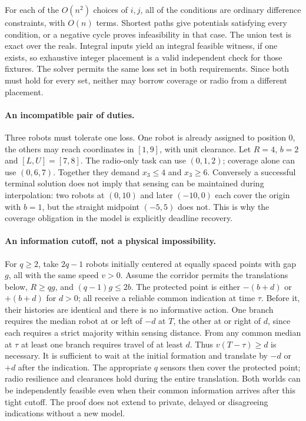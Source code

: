\documentclass{article}
\begin{document}
For each of the $O(n^2)$ choices of $i,j$, all of the conditions are
ordinary difference constraints, with $O(n)$ terms. Shortest paths
give potentials satisfying every condition, or a negative cycle
proves infeasibility in that case. The union test is exact over the
reals. Integral inputs yield an integral feasible witness, if
one exists, so exhaustive integer placement is a valid independent
check for those fixtures. The solver permits the same loss set in
both requirements. Since both must hold for every set, neither may
borrow coverage or radio from a different placement.

\paragraph{An incompatible pair of duties.}
Three robots must tolerate one loss. One robot is already assigned to
position 0, the others may reach coordinates in $[1,9]$, with unit
clearance. Let $R=4$, $b=2$ and $[L,U]=[7,8]$. The radio-only task
can use $(0,1,2)$; coverage alone can use $(0,6,7)$.
Together they demand $x_3\le4$ and $x_3\ge6$.
Conversely a successful terminal solution does not imply that sensing
can be maintained during interpolation: two robots at $(0,10)$
and later $(-10,0)$ each cover the origin with $b=1$, but the straight
midpoint $(-5,5)$ does not. This is why the coverage obligation in
the model is explicitly deadline recovery.

\paragraph{An information cutoff, not a physical impossibility.}
For $q\ge2$, take $2q-1$ robots initially centered at equally spaced
points with gap $g$, all with the same speed $v>0$. Assume the corridor
permits the translations below, $R\ge qg$, and $(q-1)g\le2b$.
The protected point is either $-(b+d)$ or $+(b+d)$ for $d>0$;
all receive a reliable common indication at time $\tau$. Before it,
their histories are identical and there is no informative action.
One branch requires the median robot at or left of $-d$ at $T$,
the other at or right of $d$, since each requires a strict majority
within sensing distance. From any common median at $\tau$ at
least one branch requires travel of at least $d$. Thus
$v(T-\tau)\ge d$ is necessary. It is sufficient to wait at the
initial formation and translate by $-d$ or $+d$ after the indication.
The appropriate $q$ sensors then cover the protected point; radio
resilience and clearances hold during the entire translation.
Both worlds can be independently feasible even when their common
information arrives after this tight cutoff. The proof does not extend
to private, delayed or disagreeing indications without a new model.
\end{document}
